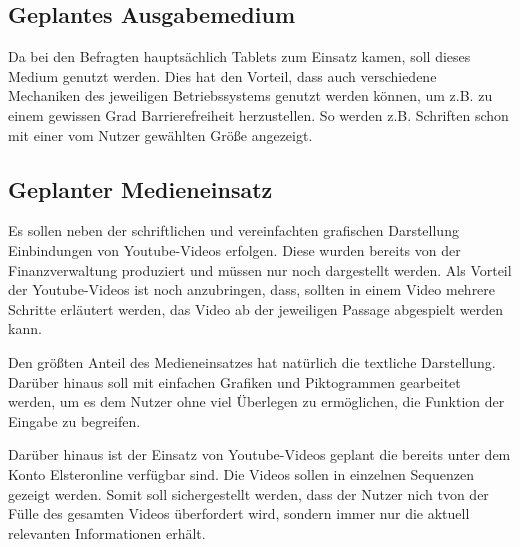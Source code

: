 \subsection{Geplantes Ausgabemedium}\label{Geplantes Ausgabemedium}
Da bei den Befragten hauptsächlich Tablets zum Einsatz kamen, soll dieses Medium genutzt werden. Dies hat den Vorteil, dass auch verschiedene Mechaniken des jeweiligen Betriebssystems genutzt werden können, um z.B. zu einem gewissen Grad Barrierefreiheit herzustellen. So werden z.B. Schriften schon mit einer vom Nutzer gewählten Größe angezeigt.

\subsection{Geplanter Medieneinsatz}\label{Geplanter Medieneinsatz}
Es sollen neben der schriftlichen und vereinfachten grafischen Darstellung Einbindungen von Youtube-Videos erfolgen. Diese wurden bereits von der Finanzverwaltung produziert und müssen nur noch dargestellt werden. Als Vorteil der Youtube-Videos ist noch anzubringen, dass, sollten in einem Video mehrere Schritte erläutert werden, das Video ab der jeweiligen Passage abgespielt werden kann. 

Den größten Anteil des Medieneinsatzes hat natürlich die textliche Darstellung. Darüber hinaus soll mit einfachen Grafiken und Piktogrammen gearbeitet werden, um es dem Nutzer ohne viel Überlegen zu ermöglichen, die Funktion der Eingabe zu begreifen. 

Darüber hinaus ist der Einsatz von Youtube-Videos geplant die bereits unter dem Konto \grqq{}Elsteronline\grqq{} verfügbar sind. Die Videos sollen in einzelnen Sequenzen gezeigt werden. Somit soll sichergestellt werden, dass der Nutzer nich tvon der Fülle des gesamten Videos überfordert wird, sondern immer nur die aktuell relevanten Informationen erhält.